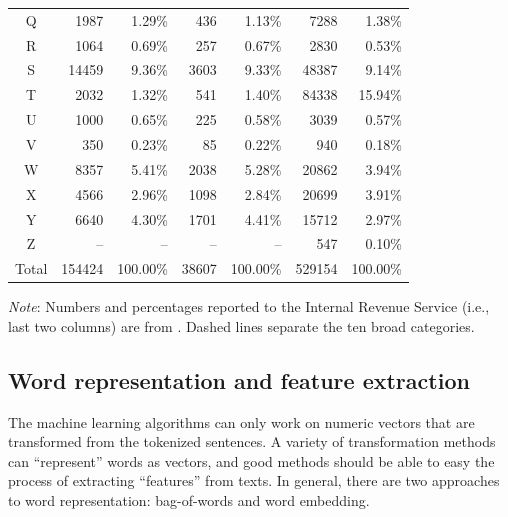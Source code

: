 \documentclass[11pt]{article}
\begin{document}
\begin{table}[t]
\begin{threeparttable}
\begin{tabularx}{\textwidth}{c|r|r|r|r|r|r}
			\hdashline
			Q & \num{1987} & \num{1.29}\% & \num{436} & \num{1.13}\% & \num{7288} & \num{1.38}\% \\
			\hdashline
			R & \num{1064} & \num{0.69}\% & \num{257} & \num{0.67}\% & \num{2830} & \num{0.53}\% \\
			S & \num{14459} & \num{9.36}\% & \num{3603} & \num{9.33}\% & \num{48387} & \num{9.14}\% \\
			T & \num{2032} & \num{1.32}\% & \num{541} & \num{1.40}\% & \num{84338} & \num{15.94}\% \\
			U & \num{1000} & \num{0.65}\% & \num{225} & \num{0.58}\% & \num{3039} & \num{0.57}\% \\
			V & \num{350} & \num{0.23}\% & \num{85} & \num{0.22}\% & \num{940} & \num{0.18}\% \\
			W & \num{8357} & \num{5.41}\% & \num{2038} & \num{5.28}\% & \num{20862} & \num{3.94}\% \\
			\hdashline
			X & \num{4566} & \num{2.96}\% & \num{1098} & \num{2.84}\% & \num{20699} & \num{3.91}\% \\
			\hdashline
			Y & \num{6640} & \num{4.30}\% & \num{1701} & \num{4.41}\% & \num{15712} & \num{2.97}\% \\
			\hdashline
			Z & -- & -- & -- & -- & \num{547} & \num{0.10}\% \\
			\hline
			Total & \num{154424} & \num{100.00}\% & \num{38607} & \num{100.00}\% & \num{529154} & \num{100.00}\% \\
         \hline
    \end{tabularx}
    \begin{tablenotes}
    \item\footnotesize \textit{Note}: Numbers and percentages reported to the Internal Revenue Service (i.e., last two columns) are from \textcite{McKeeverNonprofitAlmanacEssential2016}. Dashed lines separate the ten broad categories.
    \end{tablenotes}
    \end{threeparttable}
\end{table}

\subsection{Word representation and feature extraction}

The machine learning algorithms can only work on numeric vectors that are transformed from the tokenized sentences. A variety of transformation methods can ``represent'' words as vectors, and good methods should be able to easy the process of extracting ``features'' from texts. In general, there are two approaches to word representation: bag-of-words and word embedding.
\end{document}
